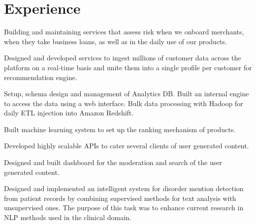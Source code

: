 \documentclass[]{rajnikant-resume-openfont}
\begin{document}
\hfill
\begin{minipage}[t]{0.66\textwidth} 


\section{Experience}

\begin{tightemize}
	\item  Building and maintaining services that assess risk when we onboard merchants, when they take business loans, as well as in the daily use of our products. 
\end{tightemize}
\sectionsep

\begin{tightemize}
\item {}  Designed and developed services to ingest millions of customer data across the platform on a
real-time basis and unite them into a single profile per customer for recommendation engine.
\item {} Setup, schema design and management of Analytics DB. Built an internal engine to
access the data using a web interface. Bulk data processing with Hadoop for daily ETL injection into Amazon Redshift.

\end{tightemize}
\sectionsep


\begin{tightemize}
\item Built machine learning system to set up the ranking mechanism of products. 
\item Developed highly scalable APIs  to cater several clients of user generated content.
\item Designed and built dashboard for the moderation  and search of the user generated content.
\end{tightemize}
\sectionsep

\begin{tightemize}
\item  {} Designed and implemented an intelligent system for disorder mention detection from
patient records by combining supervised methods for text analysis with unsupervised ones. The purpose of this
task was to enhance current research in NLP methods used in the clinical domain.
\end{tightemize}


\end{minipage}
\end{document}
